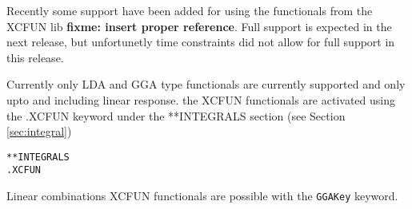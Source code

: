 \begin{description}
Recently some support have been added for using the functionals from the XCFUN lib \textbf{fixme: insert proper reference}. Full 
support is expected in the next release, but unfortunetly time constraints did not allow for 
full support in this release. 

Currently only LDA and GGA type functionals are currently supported and only upto and including 
linear response. the XCFUN functionals are activated using the .XCFUN keyword under the **INTEGRALS section (see Section \ref{sec:integral})
\begin{verbatim}
**INTEGRALS
.XCFUN
\end{verbatim} 
Linear combinations XCFUN functionals are possible with the \verb|GGAKey| keyword.

\end{description}

